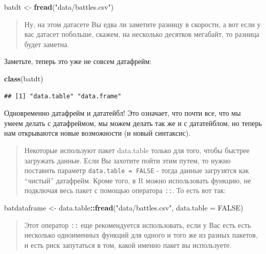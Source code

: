 \documentclass[]{book}
\newenvironment{Shaded}{\begin{snugshade}}{\end{snugshade}}
\newcommand{\KeywordTok}[1]{\textcolor[rgb]{0.13,0.29,0.53}{\textbf{#1}}}
\newcommand{\DataTypeTok}[1]{\textcolor[rgb]{0.13,0.29,0.53}{#1}}
\newcommand{\StringTok}[1]{\textcolor[rgb]{0.31,0.60,0.02}{#1}}
\newcommand{\OtherTok}[1]{\textcolor[rgb]{0.56,0.35,0.01}{#1}}
\newcommand{\OperatorTok}[1]{\textcolor[rgb]{0.81,0.36,0.00}{\textbf{#1}}}
\newcommand{\NormalTok}[1]{#1}
\begin{document}
\begin{Shaded}
\begin{Highlighting}[]
\NormalTok{batdt <-}\StringTok{ }\KeywordTok{fread}\NormalTok{(}\StringTok{"data/battles.csv"}\NormalTok{)}
\end{Highlighting}
\end{Shaded}

\begin{quote}
Ну, на этом датасете Вы едва ли заметите разницу в скорости, а вот если
у вас датасет побольше, скажем, на несколько десятков мегабайт, то
разница будет заметна.
\end{quote}

Заметьте, теперь это уже не совсем датафрейм:

\begin{Shaded}
\begin{Highlighting}[]
\KeywordTok{class}\NormalTok{(batdt)}
\end{Highlighting}
\end{Shaded}

\begin{verbatim}
## [1] "data.table" "data.frame"
\end{verbatim}

Одновременно датафрейм и дататейбл! Это означает, что почти все, что мы
умеем делать с датафреймом, мы можем делать так же и с дататейблом, но
теперь нам открываются новые возможности (и новый синтаксис).

\begin{quote}
Некоторые используют пакет data.table только для того, чтобы быстрее
загружать данные. Если Вы захотите пойти этим путем, то нужно поставить
параметр \texttt{data.table\ =\ FALSE} - тогда данные загрузятся как
``чистый'' датафрейм. Кроме того, в R можно использовать функцию, не
подключая весь пакет с помощью оператора \texttt{::}. То есть вот так:
\end{quote}

\begin{Shaded}
\begin{Highlighting}[]
\NormalTok{batdataframe <-}\StringTok{ }\NormalTok{data.table}\OperatorTok{::}\KeywordTok{fread}\NormalTok{(}\StringTok{"data/battles.csv"}\NormalTok{, }\DataTypeTok{data.table =} \OtherTok{FALSE}\NormalTok{)}
\end{Highlighting}
\end{Shaded}

\begin{quote}
Этот оператор \texttt{::} еще рекомендуется использовать, если у Вас
есть есть несколько одноименных функций для одного и того же из разных
пакетов, и есть риск запутаться в том, какой именно пакет вы
используете.
\end{quote}
\end{document}
